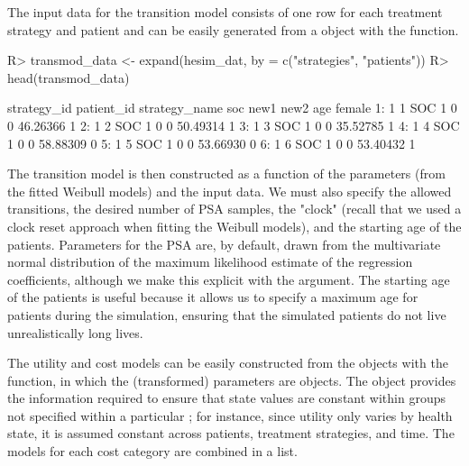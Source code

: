 \documentclass[article, nojss]{jss}\usepackage[]{graphicx}\usepackage[]{color}
\begin{document}
The input data for the transition model consists of one row for each treatment strategy and patient and can be easily generated from a  object with the  function.

\begin{Schunk}
\begin{Sinput}
R> transmod_data <- expand(hesim_dat, by = c("strategies", "patients"))
R> head(transmod_data)
\end{Sinput}
\begin{Soutput}
   strategy_id patient_id strategy_name soc new1 new2      age female
1:           1          1           SOC   1    0    0 46.26366      1
2:           1          2           SOC   1    0    0 50.49314      1
3:           1          3           SOC   1    0    0 35.52785      1
4:           1          4           SOC   1    0    0 58.88309      0
5:           1          5           SOC   1    0    0 53.66930      0
6:           1          6           SOC   1    0    0 53.40432      1
\end{Soutput}
\end{Schunk}

The transition model is then constructed as a function of the parameters (from the fitted Weibull models) and the input data. We must also specify the allowed transitions, the desired number of PSA samples, the "clock" (recall that we used a clock reset approach when fitting the Weibull models), and the starting age of the patients. Parameters for the PSA are, by default, drawn from the multivariate normal distribution of the maximum likelihood estimate of the regression coefficients, although we make this explicit with the  argument. The starting age of the patients is useful because it allows us to specify a maximum age for patients during the simulation, ensuring that the simulated patients do not live unrealistically long lives. 

\begin{Schunk}
\end{Schunk}

The utility and cost models can be easily constructed from the  objects with the  function, in which the (transformed) parameters are  objects. The  object provides the information required to ensure that state values are constant within groups not specified within a particular ; for instance, since utility only varies by health state, it is assumed constant across patients, treatment strategies, and time. The models for each cost category are combined in a list.
  
\end{document}
